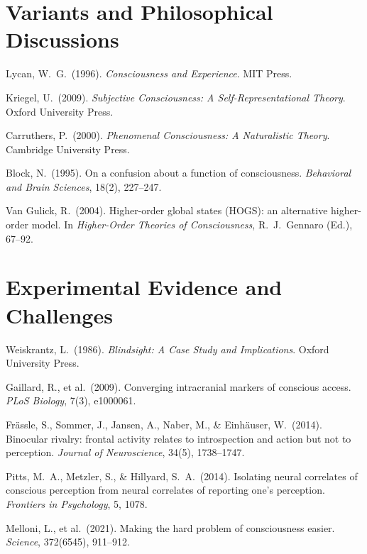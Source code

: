 \documentclass[11pt,a4paper]{report}
\begin{document}
\section*{Variants and Philosophical Discussions}
\begin{enumerate}[label={[\arabic*]}, leftmargin=2.5em, start=15]
  \item Lycan, W.\ G.\ (1996). \textit{Consciousness and Experience}. MIT Press.
  \item Kriegel, U.\ (2009). \textit{Subjective Consciousness: A Self-Representational Theory}. Oxford University Press.
  \item Carruthers, P.\ (2000). \textit{Phenomenal Consciousness: A Naturalistic Theory}. Cambridge University Press.
  \item Block, N.\ (1995). On a confusion about a function of consciousness. \textit{Behavioral and Brain Sciences}, 18(2), 227--247.
  \item Van Gulick, R.\ (2004). Higher-order global states (HOGS): an alternative higher-order model. In \textit{Higher-Order Theories of Consciousness}, R.\ J.\ Gennaro (Ed.), 67--92.
\end{enumerate}

\section*{Experimental Evidence and Challenges}
\begin{enumerate}[label={[\arabic*]}, leftmargin=2.5em, start=20]
  \item Weiskrantz, L.\ (1986). \textit{Blindsight: A Case Study and Implications}. Oxford University Press.
  \item Gaillard, R., et al.\ (2009). Converging intracranial markers of conscious access. \textit{PLoS Biology}, 7(3), e1000061.
  \item Frässle, S., Sommer, J., Jansen, A., Naber, M., \& Einhäuser, W.\ (2014). Binocular rivalry: frontal activity relates to introspection and action but not to perception. \textit{Journal of Neuroscience}, 34(5), 1738--1747.
  \item Pitts, M.\ A., Metzler, S., \& Hillyard, S.\ A.\ (2014). Isolating neural correlates of conscious perception from neural correlates of reporting one's perception. \textit{Frontiers in Psychology}, 5, 1078.
  \item Melloni, L., et al.\ (2021). Making the hard problem of consciousness easier. \textit{Science}, 372(6545), 911--912.
\end{enumerate}
\end{document}
